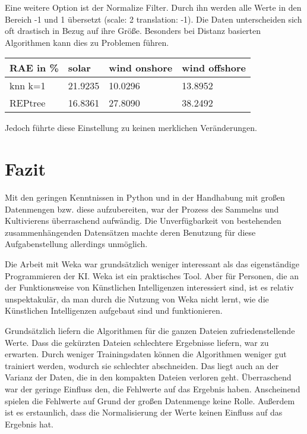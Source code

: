 \documentclass[letterpaper]{article} %
\begin{document}
    Eine weitere Option ist der Normalize Filter. Durch ihn werden alle Werte in den Bereich -1 und 1 übersetzt (scale: 2 translation: -1). Die Daten unterscheiden sich oft drastisch in Bezug auf ihre Größe. Besonders bei Distanz basierten Algorithmen kann dies zu Problemen führen.
    \hfill\break
    \begin{center}
        \begin{tabular}{|l||l|l|l|}
            \hline
            RAE in \%&solar&wind onshore&wind offshore\\
            \hline
            \hline
            knn k=1&21.9235&10.0296&13.8952\\
            \hline
            REPtree&16.8361&27.8090&38.2492\\
            \hline
        \end{tabular}
    \end{center}
    \hfill\break
    Jedoch führte diese Einstellung zu keinen merklichen Veränderungen.

\section*{Fazit}
    Mit den geringen Kenntnissen in Python und in der Handhabung mit großen Datenmengen bzw. diese aufzubereiten, war der Prozess des Sammelns und Kultivierens überraschend aufwändig. Die Unverfügbarkeit von bestehenden zusammenhängenden Datensätzen machte deren Benutzung für diese Aufgabenstellung allerdings unmöglich. 
    
    Die Arbeit mit Weka war grundsätzlich weniger interessant als das eigenständige Programmieren der KI. Weka ist ein praktisches Tool. Aber für Personen, die an der Funktionsweise von Künstlichen Intelligenzen interessiert sind, ist es relativ unspektakulär, da man durch die Nutzung von Weka nicht lernt, wie die Künstlichen Intelligenzen aufgebaut sind und funktionieren.
    
    Grundsätzlich liefern die Algorithmen für die ganzen Dateien zufriedenstellende Werte. Dass die gekürzten Dateien schlechtere Ergebnisse liefern, war zu erwarten. Durch weniger Trainingsdaten können die Algorithmen weniger gut trainiert werden, wodurch sie schlechter abschneiden. Das liegt auch an der Varianz der Daten, die in den kompakten Dateien verloren geht. Überraschend war der geringe Einfluss den, die Fehlwerte auf das Ergebnis haben. Anscheinend spielen die Fehlwerte auf Grund der großen Datenmenge keine Rolle. Außerdem ist es erstaunlich, dass die Normalisierung der Werte keinen Einfluss auf das Ergebnis hat. 


\end{document}
